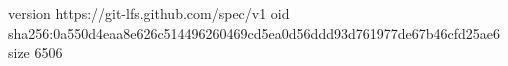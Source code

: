 version https://git-lfs.github.com/spec/v1
oid sha256:0a550d4eaa8e626c514496260469cd5ea0d56ddd93d761977de67b46cfd25ae6
size 6506
